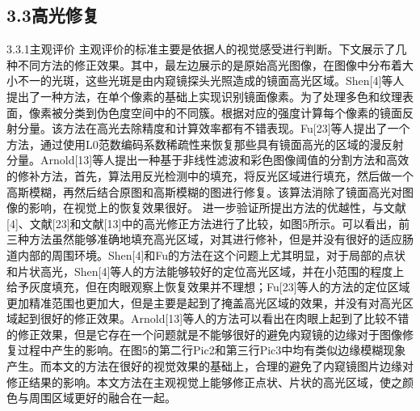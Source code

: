\documentclass[UTF8,a4paper,12pt]{ctexart}
\begin{document}
\subsection{3.3高光修复}
3.3.1主观评价
主观评价的标准主要是依据人的视觉感受进行判断。下文展示了几种不同方法的修正效果。其中，最左边展示的是原始高光图像，在图像中分布着大小不一的光斑，这些光斑是由内窥镜探头光照造成的镜面高光区域。Shen[4]等人提出了一种方法，在单个像素的基础上实现识别镜面像素。为了处理多色和纹理表面，像素被分类到伪色度空间中的不同簇。根据对应的强度计算每个像素的镜面反射分量。该方法在高光去除精度和计算效率都有不错表现。Fu[23]等人提出了一个方法，通过使用L0范数编码系数稀疏性来恢复那些具有镜面高光的区域的漫反射分量。Arnold[13]等人提出一种基于非线性滤波和彩色图像阈值的分割方法和高效的修补方法，首先，算法用反光检测中的填充，将反光区域进行填充，然后做一个高斯模糊，再然后结合原图和高斯模糊的图进行修复。该算法消除了镜面高光对图像的影响，在视觉上的恢复效果很好。
进一步验证所提出方法的优越性，与文献[4]、文献[23]和文献[13]中的高光修正方法进行了比较，如图5所示。可以看出，前三种方法虽然能够准确地填充高光区域，对其进行修补，但是并没有很好的适应肠道内部的周围环境。Shen[4]和Fu的方法在这个问题上尤其明显，对于局部的点状和片状高光，Shen[4]等人的方法能够较好的定位高光区域，并在小范围的程度上给予灰度填充，但在肉眼观察上恢复效果并不理想；Fu[23]等人的方法的定位区域更加精准范围也更加大，但是主要是起到了掩盖高光区域的效果，并没有对高光区域起到很好的修正效果。Arnold[13]等人的方法可以看出在肉眼上起到了比较不错的修正效果，但是它存在一个问题就是不能够很好的避免内窥镜的边缘对于图像修复过程中产生的影响。在图5的第二行Pic2和第三行Pic3中均有类似边缘模糊现象产生。而本文的方法在很好的视觉效果的基础上，合理的避免了内窥镜图片边缘对修正结果的影响。本文方法在主观视觉上能够修正点状、片状的高光区域，使之颜色与周围区域更好的融合在一起。
\end{document}
